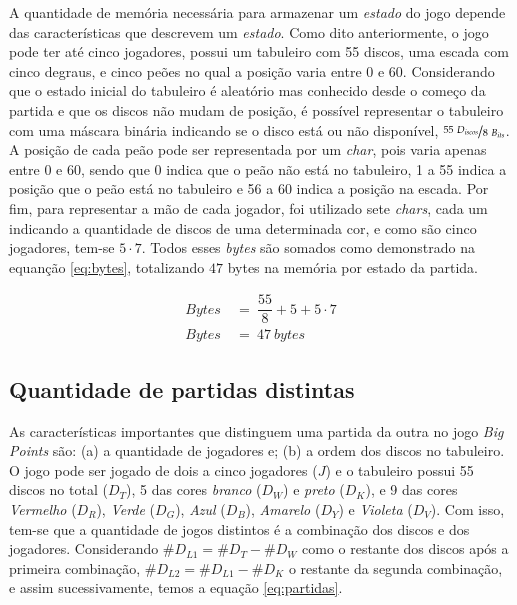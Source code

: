 A quantidade de memória necessária para armazenar um \emph{estado} do jogo depende das características que descrevem um \emph{estado}. Como dito anteriormente, o jogo pode ter até cinco jogadores, possui um tabuleiro com 55 discos, uma escada com cinco degraus, e cinco peões no qual a posição varia entre 0 e 60. Considerando que o estado inicial do tabuleiro é aleatório mas conhecido desde o começo da partida e que os discos não mudam de posição, é possível representar o tabuleiro com uma máscara binária indicando se o disco está ou não disponível, $\nicefrac{55\ D_{iscos}}{8\ B_{its}}$. A posição de cada peão pode ser representada por um \emph{char}, pois varia apenas entre 0 e 60, sendo que 0 indica que o peão não está no tabuleiro, 1 a 55 indica a posição que o peão está no tabuleiro e 56 a 60 indica a posição na escada. Por fim, para representar a mão de cada jogador, foi utilizado sete \emph{chars}, cada um indicando a quantidade de discos de uma determinada cor, e como são cinco jogadores, tem-se $5\cdot 7$. Todos esses \emph{bytes} são somados como demonstrado na equanção \ref{eq:bytes}, totalizando $47$ bytes na memória por estado da partida.

\begin{equation} \label{eq:bytes} \tag{e.q. Bytes na memória}
\begin{split}
Bytes\ &=\ \dfrac{55}{8} + 5 + 5\cdot 7\\
Bytes\ &=\ 47\ bytes
\end{split}
\end{equation}

\subsection{Quantidade de partidas distintas}
As características importantes que distinguem uma partida da outra no jogo \emph{Big Points} são: (a) a quantidade de jogadores e; (b) a ordem dos discos no tabuleiro. O jogo pode ser jogado de dois a cinco jogadores ($J$) e o tabuleiro possui 55 discos no total ($D_T$), 5 das cores \emph{branco} ($D_W$) e \emph{preto} ($D_K$), e 9 das cores \emph{Vermelho} ($D_R$), \emph{Verde} ($D_G$), \emph{Azul} ($D_B$), \emph{Amarelo} ($D_Y$) e \emph{Violeta} ($D_V$). Com isso, tem-se que a quantidade de jogos distintos é a combinação dos discos e dos jogadores. Considerando $\#D_{L1} = \#D_T - \#D_W$ como o restante dos discos após a primeira combinação, $\#D_{L2} = \#D_{L1} - \#D_K$ o restante da segunda combinação, e assim sucessivamente, temos a equação \ref{eq:partidas}.

